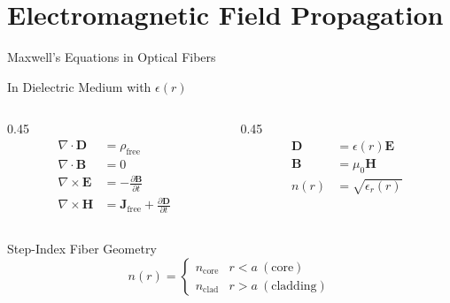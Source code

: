 \documentclass[10pt]{beamer}
\begin{document}
\section{Electromagnetic Field Propagation}

\begin{frame}{Maxwell's Equations in Optical Fibers}
\begin{block}{In Dielectric Medium with $\epsilon(r)$}
\begin{columns}
\begin{column}{0.45\textwidth}
\begin{align*}
\nabla \cdot \mathbf{D} &= \rho_{\text{free}} \\
\nabla \cdot \mathbf{B} &= 0 \\
\nabla \times \mathbf{E} &= -\frac{\partial \mathbf{B}}{\partial t} \\
\nabla \times \mathbf{H} &= \mathbf{J}_{\text{free}} + \frac{\partial \mathbf{D}}{\partial t}
\end{align*}
\end{column}
\begin{column}{0.45\textwidth}
\begin{align*}
\mathbf{D} &= \epsilon(r)\mathbf{E} \\
\mathbf{B} &= \mu_0\mathbf{H} \\
n(r) &= \sqrt{\epsilon_r(r)}
\end{align*}
\end{column}
\end{columns}
\end{block}

\begin{block}{Step-Index Fiber Geometry}
\begin{equation*}
n(r) = \begin{cases}
n_{\text{core}} & r < a \ (\text{core}) \\
n_{\text{clad}} & r > a \ (\text{cladding})
\end{cases}
\end{equation*}
\end{block}
\end{frame}
\end{document}
